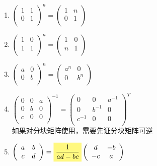 \documentclass[UTF8,a4paper,12pt,scheme=chinese]{ctexbook}
\newcommand{\hla}[1]{%
	\colorbox{yellow!50}{$\displaystyle#1$}}
\begin{document}
	\begin{enumerate}
		\item $\left(
		\begin{array}{cc}
		1 & 1 \\
		0 & 1 \\
		\end{array}
		\right)^n=\left(
		\begin{array}{cc}
		1 & n \\
		0 & 1 \\
		\end{array}
		\right)$
		\item $\left(
		\begin{array}{cc}
		1 & 0 \\
		1 & 1 \\
		\end{array}
		\right)^n=\left(
		\begin{array}{cc}
		1 & 0 \\
		n & 1 \\
		\end{array}
		\right)$
		\item $
		\left(
		\begin{array}{cc}
		a & 0 \\
		0 & b \\
		\end{array}
		\right)^n=
		\left(
		\begin{array}{cc}
		a^n & 0 \\
		0 & b^n \\
		\end{array}
		\right)
		$
		\item $
		\left(
		\begin{array}{ccc}
		0 & 0 & a \\
		0 & b & 0 \\
		c & 0 & 0 \\
		\end{array}
		\right)^{-1}
		=
		\left(
		\begin{array}{ccc}
		0 & 0 & a^{-1} \\
		0 & b^{-1} & 0 \\
		c^{-1} & 0 & 0 \\
		\end{array}
		\right)^T
		$\\
		如果对分块矩阵使用，需要先证分块矩阵可逆
		\item $
		\left(
		\begin{array}{cc}
		a & b \\
		c & d \\
		\end{array}
		\right)
		=		
		\hla{\frac{1}{a d-b c}}		
		\left(
		\begin{array}{cc}
		d & -b \\
		-c & a \\
		\end{array}
		\right)
		$
	\end{enumerate}
\end{document}
